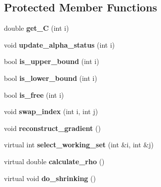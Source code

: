 \subsection*{Protected Member Functions}
\begin{DoxyCompactItemize}
\item 
\hypertarget{class_solver_ae55a8581815436d13e760dadaec34e2a}{
double {\bfseries get\_\-C} (int i)}
\label{class_solver_ae55a8581815436d13e760dadaec34e2a}

\item 
\hypertarget{class_solver_a5a978b4ff9b60b2d75e54970fd6a2c20}{
void {\bfseries update\_\-alpha\_\-status} (int i)}
\label{class_solver_a5a978b4ff9b60b2d75e54970fd6a2c20}

\item 
\hypertarget{class_solver_a98d878b13d6f710fcaa0b16e657a37b6}{
bool {\bfseries is\_\-upper\_\-bound} (int i)}
\label{class_solver_a98d878b13d6f710fcaa0b16e657a37b6}

\item 
\hypertarget{class_solver_a5876eedb0a6de6954f6037af0992cbed}{
bool {\bfseries is\_\-lower\_\-bound} (int i)}
\label{class_solver_a5876eedb0a6de6954f6037af0992cbed}

\item 
\hypertarget{class_solver_a7b5e230875b8b5f06150ff0690e36b47}{
bool {\bfseries is\_\-free} (int i)}
\label{class_solver_a7b5e230875b8b5f06150ff0690e36b47}

\item 
\hypertarget{class_solver_a043f498c1dda0122859d03f9cd07dc08}{
void {\bfseries swap\_\-index} (int i, int j)}
\label{class_solver_a043f498c1dda0122859d03f9cd07dc08}

\item 
\hypertarget{class_solver_a7e34992ede606a336606ae54f6e963e6}{
void {\bfseries reconstruct\_\-gradient} ()}
\label{class_solver_a7e34992ede606a336606ae54f6e963e6}

\item 
\hypertarget{class_solver_a95fb4eaf33362558e1fc768f4db019d3}{
virtual int {\bfseries select\_\-working\_\-set} (int \&i, int \&j)}
\label{class_solver_a95fb4eaf33362558e1fc768f4db019d3}

\item 
\hypertarget{class_solver_ad00b01f72232ca932cad68e58c9cde5a}{
virtual double {\bfseries calculate\_\-rho} ()}
\label{class_solver_ad00b01f72232ca932cad68e58c9cde5a}

\item 
\hypertarget{class_solver_ad3f6665a1ca590e56b3d51f8ddcc347c}{
virtual void {\bfseries do\_\-shrinking} ()}
\label{class_solver_ad3f6665a1ca590e56b3d51f8ddcc347c}

\end{DoxyCompactItemize}
